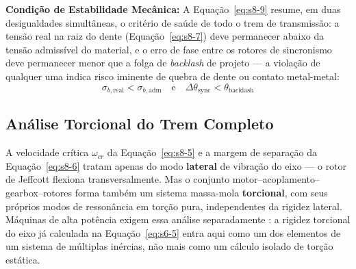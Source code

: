 \documentclass[12pt,a4paper]{article}
\numberwithin{equation}{section}
\numberwithin{table}{section}
\numberwithin{figure}{section}
\begin{document}
	\vspace{1em}
	\textbf{Condição de Estabilidade Mecânica:} A Equação~\eqref{eq:s8-9} resume, em duas desigualdades simultâneas, o critério de saúde de todo o trem de transmissão: a tensão real na raiz do dente (Equação~\eqref{eq:s8-7}) deve permanecer abaixo da tensão admissível do material, e o erro de fase entre os rotores de sincronismo deve permanecer menor que a folga de \textit{backlash} de projeto — a violação de qualquer uma indica risco iminente de quebra de dente ou contato metal-metal:
	\begin{equation}\label{eq:s8-9}
 \boxed{\sigma_{b, \text{real}} < \sigma_{b, \text{adm}} \quad \text{e} \quad \Delta \theta_{\text{sync}} < \theta_{\text{backlash}}}
\end{equation}

	\subsection{\textbf{Análise Torcional do Trem Completo}}
	A velocidade crítica $\omega_{cr}$ da Equação~\eqref{eq:s8-5} e a margem de separação da Equação~\eqref{eq:s8-6} tratam apenas do modo \textbf{lateral} de vibração do eixo — o rotor de Jeffcott flexiona transversalmente. Mas o conjunto motor–acoplamento–gearbox–rotores forma também um sistema massa-mola \textbf{torcional}, com seus próprios modos de ressonância em torção pura, independentes da rigidez lateral. Máquinas de alta potência exigem essa análise separadamente \cite{api684}: a rigidez torcional do eixo já calculada na Equação~\eqref{eq:s6-5} entra aqui como um dos elementos de um sistema de múltiplas inércias, não mais como um cálculo isolado de torção estática.
\end{document}
